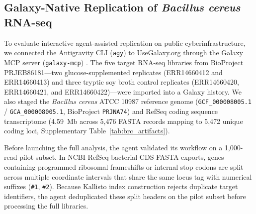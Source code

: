 \documentclass[11pt,letterpaper]{article}
\begin{document}
\subsection*{Galaxy-Native Replication of \textit{Bacillus cereus} RNA-seq}
To evaluate interactive agent-assisted replication on public cyberinfrastructure, we connected the Antigravity CLI (\texttt{agy}) to UseGalaxy.org through the Galaxy MCP server (\texttt{galaxy-mcp}) \cite{galaxymcp2026}. The five target RNA-seq libraries from BioProject PRJEB86181---two glucose-supplemented replicates (ERR14660412 and ERR14660413) and three tryptic soy broth control replicates (ERR14660420, ERR14660421, and ERR14660422)---were imported into a Galaxy history. We also staged the \textit{Bacillus cereus} ATCC 10987 reference genome (\texttt{GCF\_000008005.1} / \texttt{GCA\_000008005.1}, BioProject \texttt{PRJNA74}) and RefSeq coding sequence transcriptome (4.59~Mb across 5,476 FASTA records mapping to 5,472 unique coding loci, Supplementary Table~\ref{tab:brc_artifacts}).

Before launching the full analysis, the agent validated its workflow on a 1,000-read pilot subset. In NCBI RefSeq bacterial CDS FASTA exports, genes containing programmed ribosomal frameshifts or internal stop codons are split across multiple coordinate intervals that share the same locus tag with numerical suffixes (\texttt{\#1}, \texttt{\#2}). Because Kallisto index construction rejects duplicate target identifiers, the agent deduplicated these split headers on the pilot subset before processing the full libraries.
\end{document}
